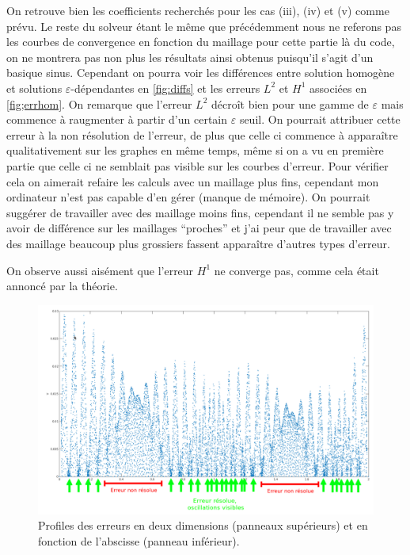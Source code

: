 \documentclass[11pt]{article}
\begin{document}
On retrouve bien les coefficients recherchés pour les cas (iii), (iv) et (v) comme prévu. Le reste du solveur étant le même que précédemment nous ne
referons pas les courbes de convergence en fonction du maillage pour cette partie là du code, on ne montrera pas non plus les résultats ainsi obtenus
puisqu'il s'agit d'un basique sinus. Cependant on pourra voir les différences entre solution homogène et solutions $\varepsilon$-dépendantes en
\autoref{fig:diffs} et les erreurs $L^2$ et $H^1$ associées en \autoref{fig;errhom}. On remarque que l'erreur $L^2$ décroît bien pour une gamme de
$\varepsilon$ mais commence à raugmenter à partir d'un certain $\varepsilon$ seuil. On pourrait attribuer cette erreur à la non résolution de
l'erreur, de plus que celle ci commence à apparaître qualitativement sur les graphes en même temps, même si on a vu en première partie que celle ci ne
semblait pas visible sur les courbes d'erreur. Pour vérifier cela on aimerait refaire les calculs avec un maillage plus fins, cependant mon ordinateur
n'est pas capable d'en gérer (manque de mémoire). On pourrait suggérer de travailler avec des maillage moins fins, cependant il ne semble pas y avoir
de différence sur les maillages ``proches'' et j'ai peur que de travailler avec des maillage beaucoup plus grossiers fassent apparaître d'autres types
d'erreur.

On observe aussi aisément que l'erreur $H^1$ ne converge pas, comme cela était annoncé par la théorie.



\begin{figure}
  \centering
  \includegraphics[width=.9\textwidth]{SolutionPbHomogeneise/non_res_osc}
  \caption{Profiles des erreurs en deux dimensions (panneaux supérieurs) et en fonction de l'abscisse (panneau inférieur).}
  \label{fig:diffs}
\end{figure}
\end{document}
